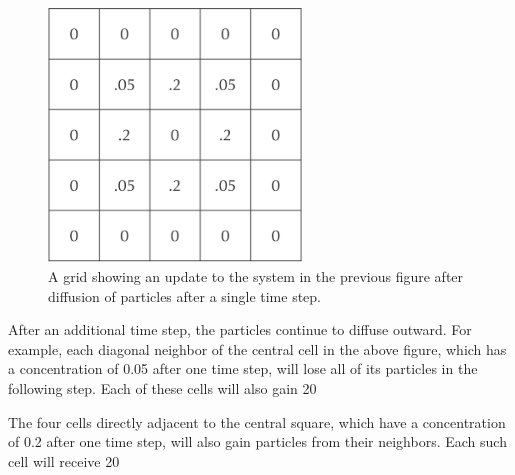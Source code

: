 {\begin{figure}[h]
\centering
\mySfFamily
\includegraphics[width = 0.6\textwidth]{../assets/images/600px/A_concentration_one_time_step.png}
\caption{A grid showing an update to the system in the previous figure after diffusion of particles after a single time step.}
\label{fig:A_concentration_one_time_step}
\end{figure}

\begin{note}\end{note}

After an additional time step, the particles continue to diffuse outward. For example, each diagonal neighbor of the central cell in the above figure, which has a concentration of 0.05 after one time step, will lose all of its particles in the following step. Each of these cells will also gain 20%

The four cells directly adjacent to the central square, which have a concentration of 0.2 after one time step, will also gain particles from their neighbors. Each such cell will receive 20%

}
